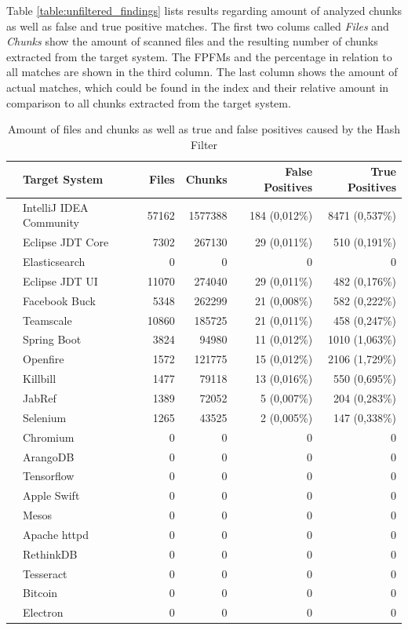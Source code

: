 Table \autoref{table:unfiltered_findings} lists results regarding amount of analyzed chunks as well as false and true positive matches.
The first two colums called \textit{Files} and \textit{Chunks} show the amount of scanned files and the resulting number of chunks extracted from the target system.
The FPFMs and the percentage in relation to all matches are shown in the third column.
The last column shows the amount of actual matches, which could be found in the index and their relative amount in comparison to all chunks extracted from the target system.

\begin{table}[ht]
	\centering
	\begin{tabular}{l|lrrrr}
		 & \textbf{Target System} & \textbf{Files} & \textbf{Chunks} & \textbf{False Positives} & \textbf{True Positives} \\ 
		\hline 
		\parbox[t]{2mm}{} 
		& IntelliJ IDEA Community & 57162 & 1577388 & 184 (0,012\%) & 8471 (0,537\%) \\
		& Eclipse JDT Core & 7302 & 267130 & 29 (0,011\%) & 510 (0,191\%) \\
		& Elasticsearch & 0 & 0 & 0 & 0  \\
		& Eclipse JDT UI & 11070 & 274040 & 29 (0,011\%) & 482 (0,176\%) \\
		& Facebook Buck & 5348 & 262299 & 21 (0,008\%) & 582 (0,222\%) \\
		& Teamscale & 10860 & 185725 & 21 (0,011\%) & 458 (0,247\%) \\
		& Spring Boot & 3824 & 94980 & 11 (0,012\%) & 1010 (1,063\%) \\
		& Openfire & 1572 & 121775 & 15 (0,012\%) & 2106 (1,729\%) \\
		& Killbill & 1477 & 79118 & 13 (0,016\%) & 550 (0,695\%) \\
		& JabRef & 1389 & 72052 & 5 (0,007\%) & 204 (0,283\%) \\
		& Selenium & 1265 & 43525 & 2 (0,005\%) & 147 (0,338\%) \\
		\hline 
		\parbox[t]{2mm}{} 
		& Chromium & 0 & 0 & 0 & 0 \\
		& ArangoDB & 0 & 0 & 0 & 0 \\
		& Tensorflow & 0 & 0 & 0 & 0 \\
		& Apple Swift & 0 & 0 & 0 & 0 \\
		& Mesos & 0 & 0 & 0 & 0 \\
		& Apache httpd & 0 & 0 & 0 & 0 \\
		& RethinkDB & 0 & 0 & 0 & 0 \\
		& Tesseract & 0 & 0 & 0 & 0 \\
		& Bitcoin & 0 & 0 & 0 & 0 \\
		& Electron & 0 & 0 & 0 & 0 \\
	\end{tabular}
	\caption{Amount of files and chunks as well as true and false positives caused by the Hash Filter}\label{table:unfiltered_findings}
\end{table}

